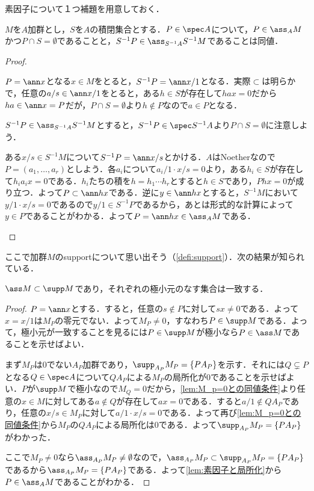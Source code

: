 素因子について１つ補題を用意しておく．

\begin{lem}\label{lem:素因子と局所化}
	$M$を$A$加群とし，$S$を$A$の積閉集合とする．$P\in\spec A$について，$P\in\ass_A M$かつ$P\cap S=\emptyset$であることと，$S^{-1}P\in\ass_{S^{-1}A} S^{-1}M$であることは同値．
\end{lem}

\begin{proof}
	\begin{eqv}
		\item 
		$P=\ann x$となる$x\in M$をとると，$S^{-1}P=\ann x/1$となる．実際$\subset$は明らかで，任意の$a/s\in\ann x/1$をとると，ある$h\in S$が存在して$hax=0$だから$ha\in\ann x=P$だが，$P\cap S=\emptyset$より$h\not\in P$なので$a\in P$となる．
		
		\item 
		$S^{-1}P\in\ass_{S^{-1}A}S^{-1}M$とすると，$S^{-1}P\in\spec S^{-1}A$より$P\cap S=\emptyset$に注意しよう．
	
		ある$x/s\in S^{-1}M$について$S^{-1}P=\ann x/s$とかける．$A$はNoetherなので$P=(a_1,\dots,a_r)$としよう．各$a_i$について$a_i/1\cdot x/s=0$より，ある$h_i\in S$が存在して$h_ia_ix=0$である．$h_i$たちの積を$h=h_1\cdots h_r$とすると$h\in S$であり，$Phx=0$が成り立つ．よって$P\subset\ann hx$である．逆に$y\in\ann hx$とすると，$S^{-1}M$において$y/1\cdot x/s=0$であるので$y/1\in S^{-1}P$であるから，あとは形式的な計算によって$y\in P$であることがわかる．よって$P=\ann hx\in\ass_A M$である．
	\end{eqv}
\end{proof}

ここで加群$M$のsupportについて思い出そう（\ref{defi:support}）．次の結果が知られている．
\begin{thm}\label{thm:assとsuppの極小元}
	$\ass M\subset\supp M$であり，それぞれの極小元のなす集合は一致する．
\end{thm}

\begin{proof}
	$ P=\ann x$とする．すると，任意の$s
	\not\in P$に対して$sx\neq0$である．よって$x=x/1$は$M_ P$の零元でない．よって$M_ P\neq0$，すなわち$ P\in\supp M$である．よって，極小元が一致することを見るには$P\in\supp M$が極小なら$P\in\ass M$であることを示せばよい．
	
	まず$M_P$は$0$でない$A_P$加群であり，$\supp_{A_P} M_P=\{PA_P\}$を示す．それには$Q\subsetneq P$となる$Q\in\spec A$について$QA_P$による$M_P$の局所化が$0$であることを示せばよい．$P$が$\supp M$で極小なので$M_Q=0$だから，\ref{lem:M_p=0との同値条件}より任意の$x\in M$に対してある$a\not\in Q$が存在して$ax=0$である．すると$a/1\not\in QA_P$であり，任意の$x/s\in M_P$に対して$a/1\cdot x/s=0$である．よって再び\ref{lem:M_p=0との同値条件}から$M_P$の$QA_P$による局所化は$0$である．よって$\supp_{A_P} M_P=\{PA_P\}$がわかった．
	
	ここで$M_P\neq0$なら$\ass_{A_P}M_P\neq\emptyset$なので，$\ass_{A_P}M_P\subset\supp_{A_P}M_P=\{PA_P\}$であるから$\ass_{A_P}M_P=\{PA_P\}$である．よって\ref{lem:素因子と局所化}から$P\in\ass_A M$であることがわかる．
\end{proof}

